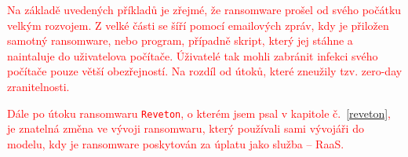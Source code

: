 \documentclass[a4paper,12pt]{article}
\begin{document}
\textcolor{red}{Na základě uvedených příkladů je zřejmé, že ransomware prošel od svého počátku velkým rozvojem. Z velké části se šíří pomocí emailových zpráv, kdy je přiložen samotný ransomware, nebo program, případně skript, který jej stáhne a naintaluje do uživatelova počítače. Úživatelé tak mohli zabránit infekci svého počítače pouze větší obezřejností. Na rozdíl od útoků, které zneužily tzv. zero-day zranitelnosti.}

\textcolor{red}{Dále po útoku ransomwaru \texttt{Reveton}, o kterém jsem psal v kapitole č.~\ref{reveton}, je znatelná změna ve vývoji ransomwaru, který používali sami vývojáři do modelu, kdy je ransomware poskytován za úplatu jako služba -- RaaS.}




\OdsazovaniOdstavcuStop
\end{document}
